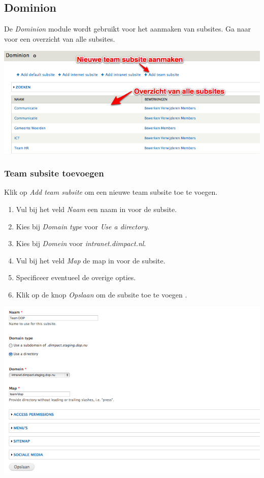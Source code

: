 \subsection{Dominion}\label{dominion}
De \emph{Dominion} module wordt gebruikt voor het aanmaken van subsites. Ga naar  voor een overzicht van alle subsites. 

\bigskip

\begin{center}
	\includegraphics[width=\textwidth]{img/dominion1.png}
\end{center}


\subsubsection{Team subsite toevoegen}\label{teamsubsitetoevoegen}
Klik op \emph{Add team subsite} om een nieuwe team subsite toe te voegen. 

\begin{enumerate}
\item Vul bij het veld \emph{Naam} een naam in voor de subsite.
\item Kies bij \emph{Domain type} voor \emph{Use a directory}.
\item Kies bij \emph{Domein} voor \emph{intranet.dimpact.nl}.
\item Vul bij het veld \emph{Map} de map in voor de subsite.
\item Specificeer eventueel de overige opties.
\item Klik op de knop \emph{Opslaan} om de subsite toe te voegen .
\end{enumerate}

\bigskip

\begin{center}
	\includegraphics[width=\textwidth]{img/dominion2.png}
\end{center}

